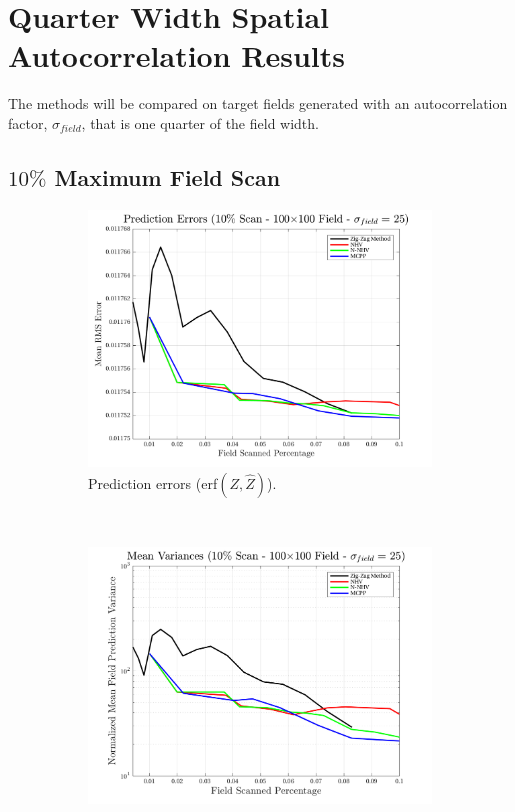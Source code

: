 \section{Quarter Width Spatial Autocorrelation Results}
The methods will be compared on target fields generated with an autocorrelation factor, $\sigma_{field}$, that is one quarter of the field width.

\clearpage
\subsection{$10\%$ Maximum Field Scan}
\begin{figure}[htb!]
    \centering
    \begin{subfigure}[t]{0.65\textwidth}
        \centering
        \includegraphics[width=\linewidth]{figures/hbresults/pred_errs_10p_100x100_sf_25_seed_2.png}
        \captionsetup{skip=0.20\baselineskip,size=footnotesize}
        \caption{Prediction errors (erf$(Z,\hat{Z})$).}
        \label{fig:prederrs_sigma25_p10_s2}
    \end{subfigure}%
    \\
    \begin{subfigure}[t]{0.65\textwidth}
        \centering
        \includegraphics[width=\linewidth]{figures/hbresults/vars_10p_100x100_sf_25_seed_2.png}

\end{subfigure}
\end{figure}
